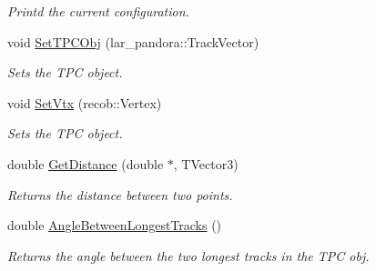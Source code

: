 \begin{DoxyCompactItemize}
\begin{DoxyCompactList}\small\item\em \-Printd the current configuration. \end{DoxyCompactList}\item 
\hypertarget{classubxsec_1_1VertexCheck_afe6992fb059684ac84b4cbf873ca190c}{void \hyperlink{classubxsec_1_1VertexCheck_afe6992fb059684ac84b4cbf873ca190c}{\-Set\-T\-P\-C\-Obj} (lar\-\_\-pandora\-::\-Track\-Vector)}\label{classubxsec_1_1VertexCheck_afe6992fb059684ac84b4cbf873ca190c}

\begin{DoxyCompactList}\small\item\em \-Sets the \-T\-P\-C object. \end{DoxyCompactList}\item 
\hypertarget{classubxsec_1_1VertexCheck_aa7ba14f2c0dc87099769e11a78a7e156}{void \hyperlink{classubxsec_1_1VertexCheck_aa7ba14f2c0dc87099769e11a78a7e156}{\-Set\-Vtx} (recob\-::\-Vertex)}\label{classubxsec_1_1VertexCheck_aa7ba14f2c0dc87099769e11a78a7e156}

\begin{DoxyCompactList}\small\item\em \-Sets the \-T\-P\-C object. \end{DoxyCompactList}\item 
\hypertarget{classubxsec_1_1VertexCheck_a2cf14a77ddd16b2fd282e2748ed4a3d9}{double \hyperlink{classubxsec_1_1VertexCheck_a2cf14a77ddd16b2fd282e2748ed4a3d9}{\-Get\-Distance} (double $\ast$, \-T\-Vector3)}\label{classubxsec_1_1VertexCheck_a2cf14a77ddd16b2fd282e2748ed4a3d9}

\begin{DoxyCompactList}\small\item\em \-Returns the distance between two points. \end{DoxyCompactList}\item 
\hypertarget{classubxsec_1_1VertexCheck_ac0d955f14da9f774c114711321c77766}{double \hyperlink{classubxsec_1_1VertexCheck_ac0d955f14da9f774c114711321c77766}{\-Angle\-Between\-Longest\-Tracks} ()}\label{classubxsec_1_1VertexCheck_ac0d955f14da9f774c114711321c77766}

\begin{DoxyCompactList}\small\item\em \-Returns the angle between the two longest tracks in the \-T\-P\-C obj. \end{DoxyCompactList}\end{DoxyCompactItemize}
